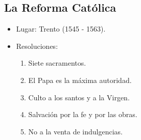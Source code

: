 \subsection{La Reforma Católica}

\begin{itemize}

\item Lugar: Trento (1545 - 1563).

\item Resoluciones:
\begin{enumerate}
	\item Siete sacramentos.
	\item El Papa es la máxima autoridad.
	\item Culto a los santos y a la Virgen.
	\item Salvación por la fe y por las obras.
	\item No a la venta de indulgencias.
\end{enumerate}

\end{itemize}